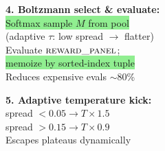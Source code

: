 \documentclass[8pt]{article}
\newlength{\colw}
\begin{document}
\begin{minipage}[t]{\colw}
\begin{keyboxG}
\textbf{4. Boltzmann select \& evaluate:}\\
\colorbox{lightgreen}{Softmax sample $M$ from pool}\\
(adaptive $\tau$: low spread $\to$ flatter)\\
Evaluate $\textsc{reward\_panel}$;\\
\colorbox{lightgreen}{memoize by sorted-index tuple}\\
{\scriptsize\color{added} Reduces expensive evals $\sim$80\%}
\end{keyboxG}\vspace{1pt}

\begin{keyboxG}
\textbf{5. Adaptive temperature kick:}\\
spread $< 0.05 \to T \times 1.5$\\
spread $> 0.15 \to T \times 0.9$\\
{\scriptsize\color{added} Escapes plateaus dynamically}
\end{keyboxG}
\end{minipage}%
\hfill
\end{document}
